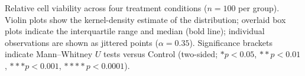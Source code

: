 \caption{Relative cell viability across four treatment conditions ($n=100$ per group). Violin plots show the kernel-density estimate of the distribution; overlaid box plots indicate the interquartile range and median (bold line); individual observations are shown as jittered points ($\alpha=0.35$). Significance brackets indicate Mann--Whitney $U$ tests versus Control (two-sided; $*p<0.05$, $**p<0.01$, $***p<0.001$, $****p<0.0001$).}
